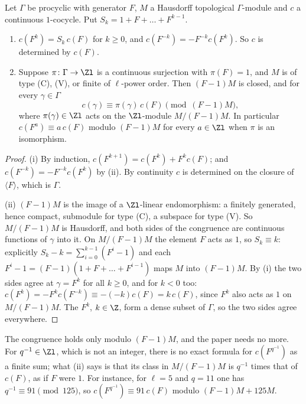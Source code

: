 \begin{lemma}\label{lem:cohomology:powers}
Let $\Gamma$ be procyclic with generator $F$, $M$ a Hausdorff topological $\Gamma$-module and $c$ a continuous $1$-cocycle. Put $S_k=1+F+\dots+F^{k-1}$.
\begin{enumerate}[label=(\roman*)]
\item $c(F^k)=S_k\,c(F)$ for $k\ge0$, and $c(F^{-k})=-F^{-k}c(F^k)$. So $c$ is determined by $c(F)$.
\item Suppose $\pi\colon\Gamma\to\Zl$ is a continuous surjection with $\pi(F)=1$, and $M$ is of type (C), (V), or finite of $\ell$-power order. Then $(F-1)M$ is
closed, and for every $\gamma\in\Gamma$
\[
c(\gamma)\equiv\pi(\gamma)\,c(F)\pmod{(F-1)M},
\]
where $\pi(\gamma)\in\Zl$ acts on the $\Zl$-module $M/(F-1)M$. In particular $c(F^a)\equiv a\,c(F)$ modulo $(F-1)M$ for every $a\in\Zl$ when $\pi$ is an isomorphism.
\end{enumerate}
\end{lemma}

\begin{proof}
(i) By induction, $c(F^{k+1})=c(F^k)+F^kc(F)$; and $c(F^{-k})=-F^{-k}c(F^k)$ by (ii). By continuity $c$ is determined on the
closure of $\langle F\rangle$, which is $\Gamma$.

(ii) $(F-1)M$ is the image of a $\Zl$-linear endomorphism: a finitely generated, hence compact, submodule for type (C), a subspace for type (V). So
$M/(F-1)M$ is Hausdorff, and both sides of the congruence are continuous functions of $\gamma$ into it. On $M/(F-1)M$ the element $F$ acts as $1$, so
$S_k\equiv k$: explicitly $S_k-k=\sum_{i=0}^{k-1}(F^i-1)$ and each $F^i-1=(F-1)(1+F+\dots+F^{i-1})$ maps $M$ into $(F-1)M$. By (i) the two sides agree at
$\gamma=F^k$ for all $k\ge0$, and for $k<0$ too: $c(F^{k})=-F^{k}c(F^{-k})\equiv-(-k)c(F)=k\,c(F)$, since $F^k$ also acts as $1$ on $M/(F-1)M$. The $F^k$, $k\in\Z$,
form a dense subset of $\Gamma$, so the two sides agree everywhere.
\end{proof}

The congruence holds only modulo $(F-1)M$, and the paper needs no more. For $q^{-1}\in\Zl$, which is not an integer, there is no exact formula for
$c(F^{q^{-1}})$ as a finite sum; what (ii) says is that its class in $M/(F-1)M$ is $q^{-1}$ times that of $c(F)$, as if $F$ were $1$. For instance, for $\ell=5$ and
$q=11$ one has $q^{-1}\equiv91\pmod{125}$, so $c(F^{q^{-1}})\equiv91\,c(F)$ modulo $(F-1)M+125M$.

